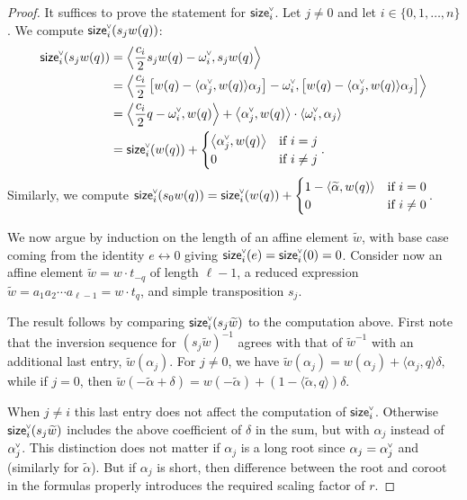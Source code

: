 \documentclass[ALCO,published]{cedram}
\newcommand{\chk}[1]{#1^{\normalfont\smash{\scalebox{.5}[.5]{\rotatebox{90}{\textbf{\textless}}}}}}
\newcommand{\cw}{\chk{\omega}}
\newcommand{\waf}{\widetilde{w}}
\newcommand{\size}{{\sf size}}
\begin{document}
\begin{proof}
It suffices to prove the statement for $\chk{\size}_i$.  Let $j \neq 0$ and let $i \in \{0,1,\ldots,n\}$.  We compute $\chk{\size}_i(s_jw(q))$:
\begin{align*}
    \chk{\size}_i(s_jw(q))
    &= \left\langle \frac{c_i}{2} s_jw(q)-\cw_i,s_jw(q)\right\rangle \\
    &= \left\langle \frac{c_i}{2} \left[w(q)-\langle \chk{\alpha}_j,w(q)\rangle\alpha_j\right]-\cw_i,\left[w(q)-\langle \chk{\alpha}_j,w(q)\rangle\alpha_j\right]\right\rangle \\
    &=\left\langle \frac{c_i}{2} q-\cw_i,w(q)\right\rangle+\left\langle \chk{\alpha}_j, w(q)\right\rangle \cdot \left\langle \cw_i,\alpha_j\right\rangle\\
    &=\chk{\size}_i(w(q))+\begin{cases}\big\langle \chk{\alpha}_j, w(q)\big\rangle & \text{if } i=j \\ 0 & \text{if } i\neq j\end{cases}.
\end{align*}
    Similarly, we compute $\chk{\size}_i(s_0w(q)) = \chk{\size}_i(w(q))+\begin{cases}1-\left\langle \widetilde{\alpha}, w(q)\right\rangle & \text{if } i=0 \\ 0 & \text{if } i\neq 0\end{cases}$.

We now argue by induction on the length of an affine element $\waf$, with base case coming from the identity $e \leftrightarrow 0$ giving $\chk{\size}_i(e)=\chk{\size}_i(0)=0$.  Consider now an affine element $\waf=w\cdot t_{-q}$ of length $\ell-1$, a reduced expression $\waf=a_1a_2\cdots a_{\ell-1}=w \cdot t_q$, and simple transposition $s_j$. 

The result follows by comparing $\chk{\size}_i(s_j\waf)$ to the computation above. First note that the inversion sequence for $(s_j\waf)^{-1}$ agrees with that of $\waf^{-1}$ with an additional last entry, $\waf(\alpha_j)$. For $j \neq 0$, we have
$    \waf (\alpha_j)
    = w(\alpha_j) + \langle \alpha_j,q\rangle \delta,$
while if $j=0$, then 
$    \waf (-\widetilde{\alpha}+\delta)
    = w(-\widetilde{\alpha}) + (1-\langle \widetilde{\alpha},q\rangle)\delta.$  

When $j\neq i$ this last entry does not affect the computation of $\chk{\size_i}$. Otherwise $\chk{\size}_i(s_j\waf)$ includes the above coefficient of $\delta$ in the sum, but with $\alpha_j$ instead of $\chk{\alpha}_j$. This distinction does not matter if  $\alpha_j$ is a long root since $\alpha_j=\chk{\alpha}_j$ and (similarly for $\widetilde{\alpha}$). But if $\alpha_j$ is short, then difference between the root and coroot in the formulas properly introduces the required scaling factor of $r$.
\end{proof}
\end{document}
